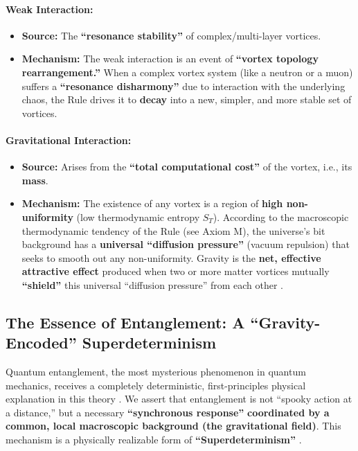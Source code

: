 \documentclass[11pt, a4paper]{article}
\begin{document}
\paragraph{Weak Interaction:}
\begin{itemize}
    \item \textbf{Source:} The \textbf{``resonance stability''} of complex/multi-layer vortices.
    \item \textbf{Mechanism:} The weak interaction is an event of \textbf{``vortex topology rearrangement.''} When a complex vortex system (like a neutron or a muon) suffers a \textbf{``resonance disharmony''} due to interaction with the underlying chaos, the Rule drives it to \textbf{decay} into a new, simpler, and more stable set of vortices.
\end{itemize}

\paragraph{Gravitational Interaction:}
\begin{itemize}
    \item \textbf{Source:} Arises from the \textbf{``total computational cost''} of the vortex, i.e., its \textbf{mass}.
    \item \textbf{Mechanism:} The existence of any vortex is a region of \textbf{high non-uniformity} (low thermodynamic entropy $S_T$). According to the macroscopic thermodynamic tendency of the Rule (see Axiom M), the universe's bit background has a \textbf{universal ``diffusion pressure''} (vacuum repulsion) that seeks to smooth out any non-uniformity. Gravity is the \textbf{net, effective attractive effect} produced when two or more matter vortices mutually \textbf{``shield''} this universal ``diffusion pressure'' from each other \cite{Newton1687}.
\end{itemize}

\subsection{The Essence of Entanglement: A ``Gravity-Encoded'' Superdeterminism}

Quantum entanglement, the most mysterious phenomenon in quantum mechanics, receives a completely deterministic, first-principles physical explanation in this theory \cite{Bell1964}. We assert that entanglement is not ``spooky action at a distance,'' but a necessary \textbf{``synchronous response''} \textbf{coordinated by a common, local macroscopic background (the gravitational field)}. This mechanism is a physically realizable form of \textbf{``Superdeterminism''} \cite{Bohm1952}.
\end{document}
